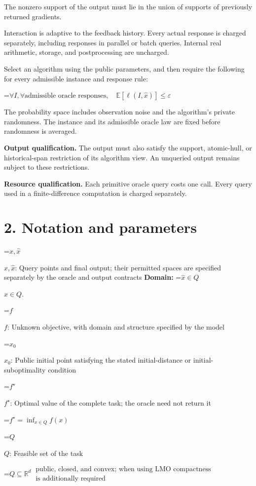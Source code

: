 \documentclass[10pt,a4paper]{article}
\newcommand{\AtlasMath}[1]{\par\begingroup\centering\setbox0=\hbox{$\displaystyle #1$}\ifdim\wd0>1.4\linewidth\typeout{ATLAS WIDE FORMULA: \the\wd0}\fi\ifdim\wd0>\linewidth\resizebox{\linewidth}{!}{\box0}\else\box0\fi\par\endgroup}
\newcommand{\AtlasInlineMath}[1]{\begingroup\setbox0=\hbox{$#1$}\ifdim\wd0>.4\linewidth\endgroup\AtlasMath{#1}\else\endgroup$#1$\fi}
\begin{document}
The nonzero support of the output must lie in the union of supports of previously returned gradients.

Interaction is adaptive to the feedback history. Every actual response is charged separately, including responses in parallel or batch queries. Internal real arithmetic, storage, and postprocessing are uncharged.

Select an algorithm using the public parameters, and then require the following for every admissible instance and response rule:


\AtlasMath{\forall I,\forall\text{admissible oracle responses},\quad\mathbb{E}[\ell(I,\widehat{x})]\le\varepsilon}


The probability space includes observation noise and the algorithm's private randomness. The instance and its admissible oracle law are fixed before randomness is averaged.

\textbf{Output qualification.} The output must also satisfy the support, atomic-hull, or historical-span restriction of its algorithm view. An unqueried output remains subject to these restrictions.

\textbf{Resource qualification.} Each primitive oracle query costs one call. Every query used in a finite-difference computation is charged separately.

\section{2. Notation and parameters}
\AtlasInlineMath{x,\widehat{x}}: Query points and final output; their permitted spaces are specified separately by the oracle and output contracts \textbf{Domain:} \AtlasInlineMath{\widehat{x}\in Q}.

\AtlasInlineMath{f}: Unknown objective, with domain and structure specified by the model

\AtlasInlineMath{x_0}: Public initial point satisfying the stated initial-distance or initial-suboptimality condition

\AtlasInlineMath{f^\star}: Optimal value of the complete task; the oracle need not return it


\AtlasMath{f^\star=\inf_{x\in Q}f(x)}


\AtlasInlineMath{Q}: Feasible set of the task


\AtlasMath{Q\subseteq\mathbb{R}^d\ \substack{\text{public, closed, and convex;  when using LMO compactness}\\\text{is additionally required}}}
\end{document}
